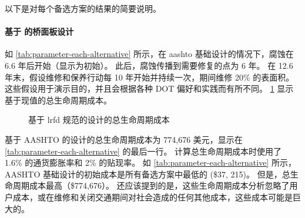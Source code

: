 以下是对每个备选方案的结果的简要说明。


\paragraph*{基于 \lrfd 的桥面板设计}
如 \cref{tab:parameter-each-alternative} 所示，在 \gls{aashto} 基础设计的情况下，腐蚀在 6.6 年后开始（显示为初始）。 此后，腐蚀传播到需要修复的点为 6 年。 在 12.6 年末，假设维修和保养行动每 10 年开始并持续一次，期间维修 20\% 的表面积。 这些假设用于演示目的，并且会根据各种 DOT 偏好和实践而有所不同。 \cref{fig:total-life-cost} 显示基于现值的总生命周期成本。

\begin{figure}
  \caption{基于 \acrshort{lrfd} 规范的设计的总生命周期成本}\label{fig:total-life-cost}
\end{figure}

基于 AASHTO 的设计的总生命周期成本为 774,676 美元，显示在 \cref{tab:parameter-each-alternative} 的最后一行。 计算总生命周期成本时使用了 1.6\% 的通货膨胀率和 2\% 的贴现率。 如 \cref{tab:parameter-each-alternative} 所示，AASHTO 基础设计的初始成本是所有备选方案中最低的 (\$37, 215)。 但是，总生命周期成本最高（\$774,676）。 还应该提到的是，这些生命周期成本分析忽略了用户成本，或在维修和关闭交通期间对社会造成的任何其他成本，这些成本可能是巨大的。


